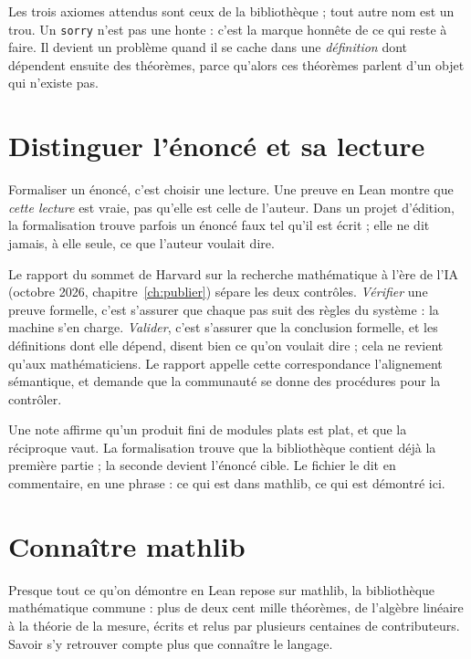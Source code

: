 Les trois axiomes attendus sont ceux de la bibliothèque ; tout autre nom est un trou. Un
\texttt{sorry} n'est pas une honte : c'est la marque honnête de ce qui reste à faire. Il
devient un problème quand il se cache dans une \emph{définition} dont dépendent ensuite
des théorèmes, parce qu'alors ces théorèmes parlent d'un objet qui n'existe pas.

\section{Distinguer l'énoncé et sa lecture}

Formaliser un énoncé, c'est choisir une lecture. Une preuve en Lean montre que \emph{cette
lecture} est vraie, pas qu'elle est celle de l'auteur. Dans un projet d'édition, la
formalisation trouve parfois un énoncé faux tel qu'il est écrit ; elle ne dit jamais, à elle
seule, ce que l'auteur voulait dire.

Le rapport du sommet de Harvard sur la recherche mathématique à l'ère de l'IA (octobre 2026,
chapitre~\ref{ch:publier}) sépare les deux contrôles. \emph{Vérifier} une preuve formelle,
c'est s'assurer que chaque pas suit des règles du système : la machine s'en charge.
\emph{Valider}, c'est s'assurer que la conclusion formelle, et les définitions dont elle
dépend, disent bien ce qu'on voulait dire ; cela ne revient qu'aux mathématiciens. Le
rapport appelle cette correspondance l'alignement sémantique, et demande que la communauté
se donne des procédures pour la contrôler.

\begin{exemple}
Une note affirme qu'un produit fini de modules plats est plat, et que la réciproque vaut.
La formalisation trouve que la bibliothèque contient déjà la première partie ; la seconde
devient l'énoncé cible. Le fichier le dit en commentaire, en une phrase : ce qui est dans
mathlib, ce qui est démontré ici.
\end{exemple}

\section{Connaître mathlib}

Presque tout ce qu'on démontre en Lean repose sur mathlib, la bibliothèque mathématique
commune : plus de deux cent mille théorèmes, de l'algèbre linéaire à la théorie de la
mesure, écrits et relus par plusieurs centaines de contributeurs. Savoir s'y retrouver
compte plus que connaître le langage.

